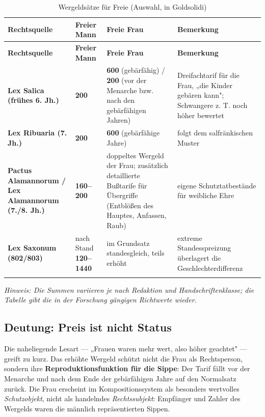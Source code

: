 \documentclass[11pt,a4paper,ngerman]{scrartcl}
\newcommand{\chipbase}[2]{\hspace{0pt}{\footnotesize\textcolor{#1}{[\textsc{#2}]}}}
\newcommand{\chipbelegt}[1]{\chipbase{chipgreen}{#1}}
\newcommand{\chipplausibel}[1]{\chipbase{chipamber}{#1}}
\begin{document}
\begin{small}
\begin{longtable}{>{\raggedright\arraybackslash}p{}>{\raggedright\arraybackslash}p{}>{\raggedright\arraybackslash}p{}>{\raggedright\arraybackslash}p{}}
\caption{Wergeldsätze für Freie (Auswahl, in Goldsolidi)}\\
\toprule
\textbf{Rechtsquelle} & \textbf{Freier Mann} & \textbf{Freie Frau} & \textbf{Bemerkung} \\
\midrule
\endfirsthead
\toprule
\textbf{Rechtsquelle} & \textbf{Freier Mann} & \textbf{Freie Frau} & \textbf{Bemerkung} \\
\midrule
\endhead
\textbf{Lex Salica (frühes 6. Jh.)} & \textbf{200} & \textbf{600} (gebärfähig) / \textbf{200} (vor der Menarche bzw. nach den gebärfähigen Jahren) & Dreifachtarif für die Frau, „die Kinder gebären kann"; Schwangere z. T. noch höher bewertet \\
\addlinespace[2pt]
\textbf{Lex Ribuaria (7. Jh.)} & \textbf{200} & \textbf{600} (gebärfähige Jahre) & folgt dem salfränkischen Muster \\
\addlinespace[2pt]
\textbf{Pactus Alamannorum / Lex Alamannorum (7./8. Jh.)} & \textbf{160–200} & doppeltes Wergeld der Frau; zusätzlich detaillierte Bußtarife für Übergriffe (Entblößen des Hauptes, Anfassen, Raub) & eigene Schutztatbestände für weibliche Ehre \\
\addlinespace[2pt]
\textbf{Lex Saxonum (802/803)} & nach Stand \textbf{120–1440} & im Grundsatz standesgleich, teils erhöht & extreme Standesspreizung überlagert die Geschlechterdifferenz \\
\addlinespace[2pt]
\bottomrule
\end{longtable}
\end{small}

\emph{Hinweis: Die Summen variieren je nach Redaktion und Handschriftenklasse; die Tabelle gibt die in der Forschung gängigen Richtwerte wieder.} \chipbelegt{belegt}

\subsection*{Deutung: Preis ist nicht Status}

Die naheliegende Lesart — „Frauen waren mehr wert, also höher geachtet" — greift zu kurz. Das erhöhte Wergeld schützt nicht die Frau als Rechtsperson, sondern ihre \textbf{Reproduktionsfunktion für die Sippe}: Der Tarif fällt vor der Menarche und nach dem Ende der gebärfähigen Jahre auf den Normalsatz zurück. Die Frau erscheint im Kompositionssystem als besonders wertvolles \emph{Schutzobjekt}, nicht als handelndes \emph{Rechtssubjekt}: Empfänger und Zahler des Wergelds waren die männlich repräsentierten Sippen. \chipplausibel{plausibel}
\end{document}
